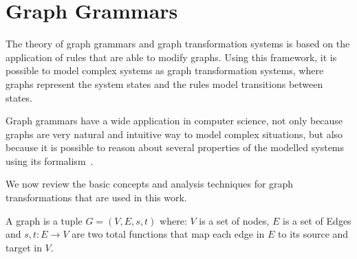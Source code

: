 \section{Graph Grammars}

The theory of graph grammars and graph transformation systems is based on the application of rules that are able to modify graphs. Using this framework, it is possible to model complex systems as graph transformation systems, where graphs represent the system states and the rules model transitions between states.

Graph grammars have a wide application in computer science, not only because graphs are very natural and intuitive way to model complex situations, but also because it is possible to reason about several properties of the modelled systems using its formalism~\cite{Ehrig2006,Rozenberg1997}.

We now review the basic concepts and analysis techniques for graph transformations that are used in this work.

\begin{definition}[Graph] A graph is a tuple $G = \left(V,E,s,t\right)$ where: $V$ is a set of nodes, $E$ is a set of Edges and $s,t : E \rightarrow V$ are two total functions that map each edge in $E$ to its source and target in $V$.

\end{definition}

